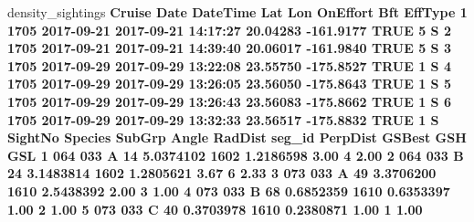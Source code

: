 \documentclass[
]{book}
\newenvironment{Shaded}{\begin{snugshade}}{\end{snugshade}}
\newcommand{\DecValTok}[1]{\textcolor[rgb]{0.00,0.00,0.81}{#1}}
\newcommand{\FloatTok}[1]{\textcolor[rgb]{0.00,0.00,0.81}{#1}}
\newcommand{\NormalTok}[1]{#1}
\newcommand{\OperatorTok}[1]{\textcolor[rgb]{0.81,0.36,0.00}{\textbf{#1}}}
\newcommand{\OtherTok}[1]{\textcolor[rgb]{0.56,0.35,0.01}{#1}}
\newcommand{\StringTok}[1]{\textcolor[rgb]{0.31,0.60,0.02}{#1}}
\begin{document}
\begin{Shaded}
\begin{Highlighting}[]
{{\NormalTok{density_sightings }\OperatorTok{%
\NormalTok{  Cruise       Date            DateTime      Lat       Lon OnEffort Bft EffType}
\DecValTok{1}   \DecValTok{1705} \DecValTok{2017-09-21} \DecValTok{2017-09-21} \DecValTok{14}\OperatorTok{:}\DecValTok{17}\OperatorTok{:}\DecValTok{27} \FloatTok{20.04283} \FloatTok{-161.9177}     \OtherTok{TRUE}   \DecValTok{5}\NormalTok{       S}
\DecValTok{2}   \DecValTok{1705} \DecValTok{2017-09-21} \DecValTok{2017-09-21} \DecValTok{14}\OperatorTok{:}\DecValTok{39}\OperatorTok{:}\DecValTok{40} \FloatTok{20.06017} \FloatTok{-161.9840}     \OtherTok{TRUE}   \DecValTok{5}\NormalTok{       S}
\DecValTok{3}   \DecValTok{1705} \DecValTok{2017-09-29} \DecValTok{2017-09-29} \DecValTok{13}\OperatorTok{:}\DecValTok{22}\OperatorTok{:}\DecValTok{08} \FloatTok{23.55750} \FloatTok{-175.8527}     \OtherTok{TRUE}   \DecValTok{1}\NormalTok{       S}
\DecValTok{4}   \DecValTok{1705} \DecValTok{2017-09-29} \DecValTok{2017-09-29} \DecValTok{13}\OperatorTok{:}\DecValTok{26}\OperatorTok{:}\DecValTok{05} \FloatTok{23.56050} \FloatTok{-175.8643}     \OtherTok{TRUE}   \DecValTok{1}\NormalTok{       S}
\DecValTok{5}   \DecValTok{1705} \DecValTok{2017-09-29} \DecValTok{2017-09-29} \DecValTok{13}\OperatorTok{:}\DecValTok{26}\OperatorTok{:}\DecValTok{43} \FloatTok{23.56083} \FloatTok{-175.8662}     \OtherTok{TRUE}   \DecValTok{1}\NormalTok{       S}
\DecValTok{6}   \DecValTok{1705} \DecValTok{2017-09-29} \DecValTok{2017-09-29} \DecValTok{13}\OperatorTok{:}\DecValTok{32}\OperatorTok{:}\DecValTok{33} \FloatTok{23.56517} \FloatTok{-175.8832}     \OtherTok{TRUE}   \DecValTok{1}\NormalTok{       S}
\NormalTok{  SightNo Species SubGrp Angle   RadDist seg_id  PerpDist GSBest GSH  GSL}
\DecValTok{1}     \DecValTok{064}     \DecValTok{033}\NormalTok{      A    }\DecValTok{14} \FloatTok{5.0374102}   \DecValTok{1602} \FloatTok{1.2186598}   \FloatTok{3.00}   \DecValTok{4} \FloatTok{2.00}
\DecValTok{2}     \DecValTok{064}     \DecValTok{033}\NormalTok{      B    }\DecValTok{24} \FloatTok{3.1483814}   \DecValTok{1602} \FloatTok{1.2805621}   \FloatTok{3.67}   \DecValTok{6} \FloatTok{2.33}
\DecValTok{3}     \DecValTok{073}     \DecValTok{033}\NormalTok{      A    }\DecValTok{49} \FloatTok{3.3706200}   \DecValTok{1610} \FloatTok{2.5438392}   \FloatTok{2.00}   \DecValTok{3} \FloatTok{1.00}
\DecValTok{4}     \DecValTok{073}     \DecValTok{033}\NormalTok{      B    }\DecValTok{68} \FloatTok{0.6852359}   \DecValTok{1610} \FloatTok{0.6353397}   \FloatTok{1.00}   \DecValTok{2} \FloatTok{1.00}
\DecValTok{5}     \DecValTok{073}     \DecValTok{033}\NormalTok{      C    }\DecValTok{40} \FloatTok{0.3703978}   \DecValTok{1610} \FloatTok{0.2380871}   \FloatTok{1.00}   \DecValTok{1} \FloatTok{1.00}
}}}
\end{Highlighting}
\end{Shaded}
\end{document}
